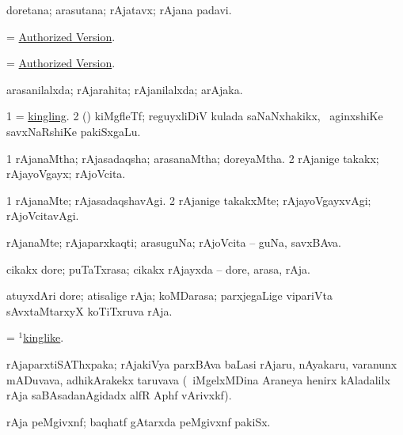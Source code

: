 \bentry
{}
\gl{\nA}
\bmng
doretana; arasutana; rAjatavx; rAjana padavi. 
\emng
\eentry

\bentry
{}
\gl{\nA}
\bmng
= \hyperref{kandict_a.pdf}{A}{Authorized Version}{Authorized Version}. 
\emng
\eentry

\bentry
{}
\gl{\nA}
\bmng
= \hyperref{kandict_a.pdf}{A}{Authorized Version}{Authorized Version}. 
\emng
\eentry

\bentry
{}
\gl{\gu}
\bmng
arasanilalxda; rAjarahita; rAjanilalxda; arAjaka. 
\emng
\eentry

\bentry
{}
\gl{\nA}
\bmng
\bnum
\num{1}  = \hyperlink{kingling}{kingling}. 
\num{2} (\ame) kiMgfleTf; reguyxliDiV kulada saNaNxhakikx, \udA\ aginxshiKe savxNaRshiKe pakiSxgaLu. 
\enum
\emng
\eentry

\bentry
{}
\gl{\gu}
\bmng
\bnum
\num{1} rAjanaMtha; rAjasadaqsha; arasanaMtha; doreyaMtha. 
\num{2} rAjanige takakx; rAjayoVgayx; rAjoVcita. 
\enum
\emng
\eentry

\bentry
{}
\gl{\kirxvi}
\bmng
\bnum
\num{1} rAjanaMte; rAjasadaqshavAgi. 
\num{2} rAjanige takakxMte; rAjayoVgayxvAgi; rAjoVcitavAgi. 
\enum
\emng
\eentry

\bentry
{}
\gl{\kirxvi}
\bmng
rAjanaMte; rAjaparxkaqti; arasuguNa; rAjoVcita -- guNa, savxBAva. 
\emng
\eentry

\bentry
{}
\gl{\nA}
\bmng
cikakx dore; puTaTxrasa; cikakx rAjayxda -- dore, arasa, rAja. 
\emng
\eentry

\bentry
{}
\gl{\nA}
\bmng
atuyxdAri dore; atisalige rAja; koMDarasa; parxjegaLige vipariVta sAvxtaMtarxyX koTiTxruva rAja. 
\emng
\eentry

\bentry
{}
\gl{\gu}
\bmng
 = \hyperlink{kinglike(1)}{$^1$kinglike}. 
\emng
\eentry

\bentry
{}
\gl{\nA}
\bmng
rAjaparxtiSAThxpaka; rAjakiVya parxBAva baLasi rAjaru, nAyakaru, \mo varanunx mADuvava, adhikArakekx taruvava (\kanmu\ iMgelxMDina Araneya henirx kAladalilx rAja saBAsadanAgidadx alfR Aphf vArivxkf). 
\emng
\eentry

\bentry
{}
\gl{\nA}
\bmng
rAja peMgivxnf; baqhatf gAtarxda peMgivxnf pakiSx.  
\emng
\eentry

